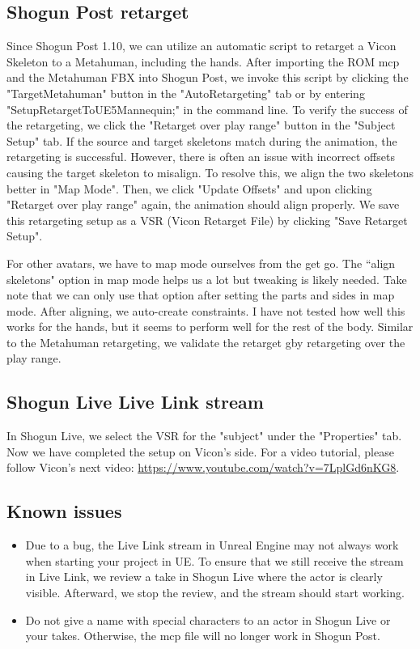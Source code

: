 \documentclass{uva-inf-article}
\begin{document}
\subsection{Shogun Post retarget}
Since Shogun Post 1.10, we can utilize an automatic script to retarget a Vicon Skeleton to a Metahuman, including the hands. After importing the ROM mcp and the Metahuman FBX into Shogun Post, we invoke this script by clicking the "TargetMetahuman" button in the "AutoRetargeting" tab or by entering "SetupRetargetToUE5Mannequin;" in the command line. To verify the success of the retargeting, we click the "Retarget over play range" button in the "Subject Setup" tab. If the source and target skeletons match during the animation, the retargeting is successful. However, there is often an issue with incorrect offsets causing the target skeleton to misalign. To resolve this, we align the two skeletons better in "Map Mode". Then, we click "Update Offsets" and upon clicking "Retarget over play range" again, the animation should align properly. We save this retargeting setup as a VSR (Vicon Retarget File) by clicking "Save Retarget Setup".

For other avatars, we have to map mode ourselves from the get go. The ``align skeletons" option in map mode helps us a lot but tweaking is likely needed. Take note that we can only use that option after setting the parts and sides in map mode. After aligning, we auto-create constraints. I have not tested how well this works for the hands, but it seems to perform well for the rest of the body. Similar to the Metahuman retargeting, we validate the retarget gby retargeting over the play range. 

\subsection{Shogun Live Live Link stream}
In Shogun Live, we select the VSR for the "subject" under the "Properties" tab. Now we have completed the setup on Vicon's side. For a video tutorial, please follow Vicon's next video: \url{https://www.youtube.com/watch?v=7LplGd6nKG8}.

\subsection{Known issues}
\begin{itemize}
    \item Due to a bug, the Live Link stream in Unreal Engine may not always work when starting your project in UE. To ensure that we still receive the stream in Live Link, we review a take in Shogun Live where the actor is clearly visible. Afterward, we stop the review, and the stream should start working.
    \item Do not give a name with special characters to an actor in Shogun Live or your takes. Otherwise, the mcp file will no longer work in Shogun Post.
\end{itemize}
\end{document}
